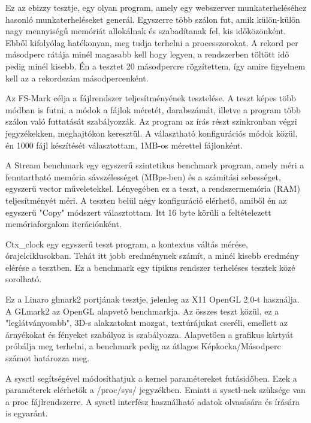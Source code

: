 Ez az ebizzy tesztje, egy olyan program, amely egy webszerver munkaterheléséhez hasonló munkaterheléseket generál. Egyszerre több szálon fut, amik külön-külön nagy mennyiségű memóriát allokálnak és szabadítanak fel, kis időközönként. Ebből kifolyólag hatékonyan, meg tudja terhelni a processzorokat. A rekord per másodperc rátája minél magasabb kell hogy legyen, a rendszerben töltött idő pedig minél kisebb. Én a tesztet 20 másodpercre rögzítettem, így amire figyelnem kell az a rekordszám másodpercenként.


Az FS-Mark célja a fájlrendszer teljesítményének tesztelése.
A teszt képes több módban is futni, a módok a fájlok méretét, darabszámát, illetve a program több szálon való futtatását szabályozzák. 
Az program az írás részt szinkronban végzi jegyzékekken, meghajtókon keresztül.
A választható konfigurációs módok közül, én 1000 fájl készítését választottam, 1MB-os mérettel fájlonként.


A Stream benchmark egy egyszerű szintetikus benchmark program, amely méri a fenntartható memória sávszélességet (MBps-ben) és a számítási sebességet, egyszerű vector műveletekkel.
Lényegében ez a teszt, a rendszermemória (RAM) teljesítményét méri.
A teszten belül négy konfiguráció elérhető, amiből én az egyszerű  "Copy" módszert választottam.
Itt 16 byte körüli a feltételezett memóriaforgalom iterációnként.


Ctx\_clock egy egyszerű teszt program, a kontextus váltás mérése, órajelciklusokban.
Tehát itt jobb eredménynek számít, a minél kisebb eredmény elérése a tesztben.
Ez a benchmark egy tipikus rendszer terheléses tesztek közé sorolható.


Ez a Linaro glmark2 portjának tesztje, jelenleg az X11 OpenGL 2.0-t használja. A GLmark2 az OpenGL alapvető benchmarkja. Az összes teszt közül, ez a "leglátványosabb", 3D-s alakzatokat mozgat, textúrájukat cseréli, emellett az árnyékokat és fényeket szabályoz is szabályozza.
Alapvetően a grafikus kártyát próbálja meg terhelni, a benchmark pedig az átlagos Képkocka/Másodperc számot határozza meg.

A sysctl segítségével módosíthatjuk a kernel paramétereket futásidőben. Ezek a paraméterek elérhetők a /proc/sys/ jegyzékben. Emiatt a sysctl-nek szüksége van a proc fájlrendszerre. A sysctl interfész használható adatok olvasására és írására is egyaránt.

